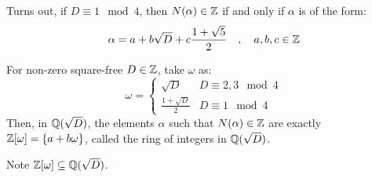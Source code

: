 Turns out, if $ D \equiv 1 \mod 4 $, then $ N(\alpha) \in \mathbb{Z} $ if and only if $ \alpha $ is
of the form:
\begin{equation*}
    \alpha = a + b\sqrt{D} + c\frac{1+\sqrt{5}}{2} \quad , \quad a,b,c \in \mathbb{Z}
\end{equation*}

\begin{thm}
    For non-zero square-free $ D \in \mathbb{Z} $, take $ \omega $ as:
    \begin{equation*}
        \omega =
        \begin{cases}
            \sqrt{D} & D \equiv 2, 3 \mod 4 \\
            \frac{1+\sqrt{D}}{2} & D \equiv 1 \mod 4
        \end{cases}
    \end{equation*} \vsp
    Then, in $ \mathbb{Q}(\sqrt{D}) $, the elements $ \alpha $ such that $ N(\alpha) \in \mathbb{Z} $ are
    exactly $ \mathbb{Z}[\omega] = \left\{{a+b\omega}\right\} $, called the ring of integers in
    $ \mathbb{Q}(\sqrt{D}) $.
\end{thm}
Note $ \mathbb{Z}[\omega] \subseteq \mathbb{Q}(\sqrt{D}) $. \vspace{-0.1in}
